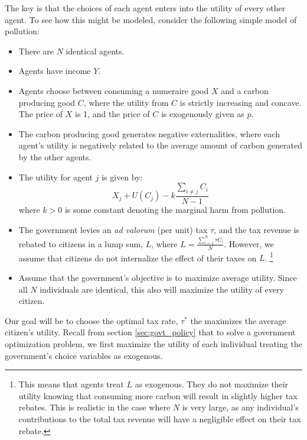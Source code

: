 The key is that the choices of each agent enters into the utility of every other agent. To see how this might be modeled, consider the following simple model of pollution:
\begin{itemize}
    \item There are $N$ identical agents.
    \item Agents have income $Y$.
    \item Agents choose between consuming a numeraire good $X$ and a carbon producing good $C$, where the utility from $C$ is strictly increasing and concave. The price of $X$ is 1, and the price of $C$ is exogenously given as $p$. 
    \item The carbon producing good generates negative externalities, where each agent's utility is negatively related to the average amount of carbon generated by the other agents. 
    \item The utility for agent $j$ is given by:
    \begin{equation*}
        X_j + U(C_j) - k \frac{\sum_{i \neq j} C_i}{N - 1}
    \end{equation*}
    where $k > 0$ is some constant denoting the marginal harm from pollution. 
    \item The government levies an \emph{ad valorum} (per unit) tax $\tau$, and the tax revenue is rebated to citizens in a lump sum, $L$, where $L = \frac{\sum_{i = 1}^N \tau C_i}{N}$. However, we assume that citizens do not internalize the effect of their taxes on $L$. \footnote{This means that agents treat $L$ as exogenous. They do not maximize their utility knowing that consuming more carbon will result in slightly higher tax rebates. This is realistic in the case where $N$ is very large, as any individual's contributions to the total tax revenue will have a negligible effect on their tax rebate.}
    \item Assume that the government's objective is to maximize average utility. Since all $N$ individuals are identical, this also will maximize the utility of every citizen. 
\end{itemize}
Our goal will be to choose the optimal tax rate, $\tau^*$ the maximizes the average citizen's utility. Recall from section \ref{sec:govt_policy} that to solve a government optimization problem, we first maximize the utility of each individual treating the government's choice variables as exogenous. 

